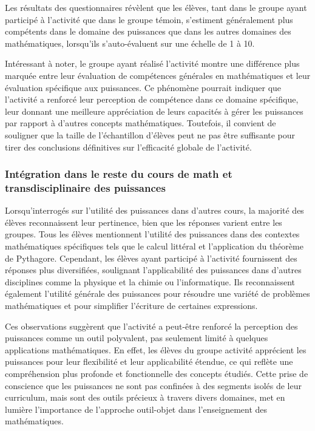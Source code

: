 Les résultats des questionnaires révèlent que les élèves,
tant dans le groupe ayant participé à l'activité que dans le groupe témoin,
s'estiment généralement plus compétents dans le domaine des puissances que dans les autres domaines des mathématiques,
lorsqu'ils s'auto-évaluent sur une échelle de 1 à 10.\\


Intéressant à noter,
le groupe ayant réalisé l'activité montre une différence plus marquée entre leur évaluation de compétences générales en mathématiques et leur évaluation spécifique aux puissances.
Ce phénomène pourrait indiquer que l'activité a renforcé leur perception de compétence dans ce domaine spécifique,
leur donnant une meilleure appréciation de leurs capacités à gérer les puissances par rapport à d'autres concepts mathématiques.
Toutefois,
il convient de souligner que la taille de l'échantillon d'élèves peut ne pas être suffisante pour tirer des conclusions définitives sur l'efficacité globale de l'activité.

\subsubsection{Intégration dans le reste du cours de math et transdisciplinaire des puissances}

Lorsqu'interrogés sur l'utilité des puissances dans d'autres cours,
la majorité des élèves reconnaissent leur pertinence,
bien que les réponses varient entre les groupes.
Tous les élèves mentionnent l'utilité des puissances dans des contextes mathématiques spécifiques tels que le calcul littéral et l'application du théorème de Pythagore.
Cependant,
les élèves ayant participé à l'activité fournissent des réponses plus diversifiées,
soulignant l'applicabilité des puissances dans d'autres disciplines comme la physique et la chimie ou l'informatique.
Ils reconnaissent également l'utilité générale des puissances pour résoudre une variété de problèmes mathématiques et pour simplifier l'écriture de certaines expressions.

\vspace*{0.5cm}

Ces observations suggèrent que l'activité a peut-être renforcé la perception des puissances comme un outil polyvalent,
pas seulement limité à quelques applications mathématiques.
En effet,
les élèves du groupe activité apprécient les puissances pour leur flexibilité et leur applicabilité étendue,
ce qui reflète une compréhension plus profonde et fonctionnelle des concepts étudiés.
Cette prise de conscience que les puissances ne sont pas confinées à des segments isolés de leur curriculum,
mais sont des outils précieux à travers divers domaines,
met en lumière l'importance de l'approche outil-objet dans l'enseignement des mathématiques.

